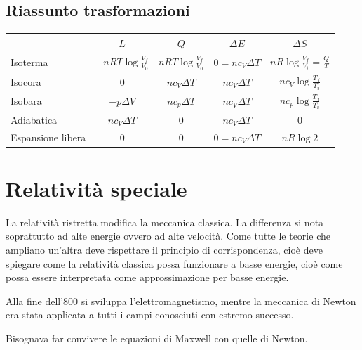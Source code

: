\section{Riassunto trasformazioni}
\begin{center}
   \begin{tabular}{p{2cm}|cccc}
                        & $L$                       & $Q$                      & $\Delta E$       & $\Delta S$                          \\
      \hline
      Isoterma          & $-nRT\log\frac{V_f}{V_0}$ & $nRT\log\frac{V_f}{V_0}$ & $0=nc_V\Delta T$ & $nR\log\frac{V_f}{V_i}=\frac{Q}{T}$ \\
      Isocora           & $0$                       & $nc_V\Delta T$           & $nc_V\Delta T$   & $nc_V\log\frac{T_f}{T_i}$           \\
      Isobara           & $-p\Delta V$              & $nc_p\Delta T$           & $nc_V\Delta T$   & $nc_p\log\frac{T_f}{T_i}$           \\
      Adiabatica        & $nc_V\Delta T$            & $0$                      & $nc_V\Delta T$   & $0$                                 \\
      Espansione libera & $0$                       & $0$                      & $0=nc_V\Delta T$ & $nR\log 2$                          \\
   \end{tabular}
\end{center}


\chapter{Relatività speciale}
\minitoc
La relatività ristretta modifica la meccanica classica. La differenza si nota soprattutto ad alte energie ovvero ad alte velocità. Come tutte le teorie che ampliano un'altra deve rispettare il principio di corrispondenza, cioè deve spiegare come la relatività classica possa funzionare a basse energie, cioè come possa essere interpretata come approssimazione per basse energie.

Alla fine dell'800 si sviluppa l'elettromagnetismo, mentre la meccanica di Newton era stata applicata a tutti i campi conosciuti con estremo successo.

Bisognava far convivere le equazioni di Maxwell con quelle di Newton.

